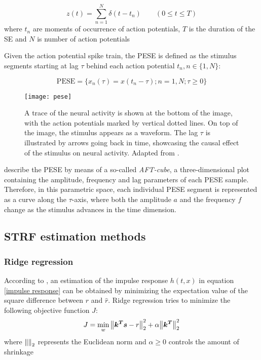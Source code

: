 \begin{equation}
	z(t) = \sum_{n=1}^N \delta(t - t _n) \qquad (0 \leq t \leq T)
\end{equation}
\noindent where $t_n$ are moments of occurrence of action potentials, $T$ is the duration of the SE and $N$ is number of action potentials

Given the action potential spike train, the PESE is defined as the stimulus segments starting at lag $\tau$ behind each action potential $t_n, n \in \{1, N\}$:

\begin{equation}
	\mathrm{PESE} = \{x_n(\tau) = x(t_n - \tau); n = 1, N; \tau \geq 0\}
\end{equation}

\begin{figure}[ht]
	\centering
	\texttt{[image: pese]}
	\caption{A trace of the neural activity is shown at the bottom of the image, with the action potentials marked by vertical dotted lines. On top of the image, the stimulus appears as a waveform. The lag $\tau$ is illustrated by arrows going back in time, showcasing the causal effect of the stimulus on neural activity. Adapted from \textcite{aertsenSpectrotemporalReceptiveFields1980a}.}
\end{figure}

\textcite{aertsenSpectrotemporalReceptiveFields1980} describe the PESE by means of a so-called \emph{AFT-cube}, a three-dimensional plot containing the amplitude, frequency and lag parameters of each PESE sample. Therefore, in this parametric space, each individual PESE segment is represented as a curve along the $\tau$-axis, where both the amplitude $a$ and the frequency $f$ change as the stimulus advances in the time dimension.

\subsection{STRF estimation methods}

\subsubsection{Ridge regression}
According to \textcite{theunissenEstimatingSpatiotemporalReceptive2001}, an estimation of the impulse response $h(t, x)$ in equation \eqref{impulse response} can be obtained by minimizing the expectation value of the square difference between $r$ and $\hat{r}$.
Ridge regression tries to minimize the following objective function $J$:
\begin{equation*}
	J = \min_w \norm{\bm{k^T}\bm{s} - r}_2^2 + \alpha \norm{\bm{k^T}}_2^2
\end{equation*}
\noindent where $\norm{}_2$ represents the Euclidean norm and $\alpha \geq 0$ controls the amount of shrinkage

